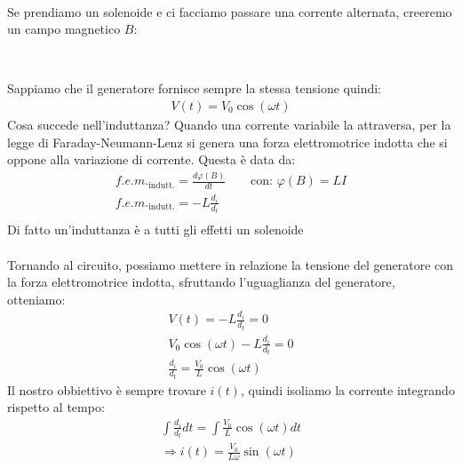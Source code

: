 \documentclass[a4paper, oneside]{article}
\begin{document}
\hfill\\
Se prendiamo un solenoide e ci facciamo passare una corrente alternata, creeremo un campo magnetico $B$:
\begin{center}
    $\qquad$
\end{center}
Sappiamo che il generatore fornisce sempre la stessa tensione quindi:
\begin{gather*}
    V(t) = V_0 \cos(\omega t)
\end{gather*} 
Cosa succede nell'induttanza? Quando una corrente variabile la attraversa, per la legge di Faraday-Neumann-Lenz si genera una forza elettromotrice indotta che si oppone alla variazione di corrente. Questa è data da:
\begin{gather*}
    {f.e.m.}_\text{indutt.} = \frac{d \varphi(B)}{dt} \qquad \text{con: }\varphi(B) = L I\\
    {f.e.m.}_\text{indutt.} = -L \frac{d_i}{d_t}\\
\end{gather*}
Di fatto un'induttanza è a tutti gli effetti un solenoide\\
\hfill\\
Tornando al circuito, possiamo mettere in relazione la tensione del generatore con la forza elettromotrice indotta, sfruttando l'uguaglianza del generatore, otteniamo:
\begin{gather*}
    V(t) = -L \frac{d_i}{d_t} = 0\\
    V_0 \cos(\omega t) -L \frac{d_i}{d_t} = 0\\
    \frac{d_i}{d_t} = \frac{V_0}{L} \cos(\omega t)
\end{gather*}
Il nostro obbiettivo è sempre trovare $i(t)$, quindi isoliamo la corrente integrando rispetto al tempo:
\begin{gather*}
    \int \frac{d_i}{d_t} dt = \int \frac{V_0}{L} \cos(\omega t) dt\\
    \Rightarrow i(t) = \frac{V_0}{L \omega} \sin(\omega t)
\end{gather*}
\end{document}
